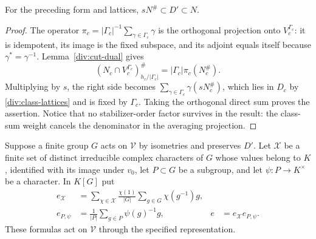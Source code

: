 \begin{proposition}\label{div:class-dual}
For the preceding form and lattices, $sN^\#\subset D'\subset N$.
\end{proposition}
\begin{proof}
The operator $\pi_c=|\Gamma_c|^{-1}\sum_{\gamma\in\Gamma_c}\gamma$
is the orthogonal projection onto $V_c^{\Gamma_c}$: it is idempotent,
its image is the fixed subspace, and its adjoint equals itself because
$\gamma^*=\gamma^{-1}$. Lemma~\ref{div:cut-dual} gives
\[
 (N_c\cap V_c^{\Gamma_c})^\#_{h_c/|\Gamma_c|}
          =|\Gamma_c|\pi_c(N_c^\#).
\]
Multiplying by $s$, the right side becomes
$\sum_{\gamma\in\Gamma_c}\gamma(sN_c^\#)$, which lies in $D_c$
by \eqref{div:class-lattices} and is fixed by $\Gamma_c$.
Taking the orthogonal direct sum proves the assertion. Notice that
no stabilizer-order factor survives in the result: the class-sum
weight cancels the denominator in the averaging projection.
\end{proof}

Suppose a finite group $G$ acts on $\mathcal V$ by isometries and
preserves $D'$. Let $\mathcal X$ be a finite set of distinct irreducible
complex characters of $G$ whose values belong to $K$, identified with
its image under $v_0$, let $P\subset G$ be a
subgroup, and let $\psi:P\to K^\times$ be a character. In $K[G]$ put
\begin{align*}
 e_{\mathcal X}
   &=\sum_{\chi\in\mathcal X}\frac{\chi(1)}{|G|}
                      \sum_{g\in G}\chi(g^{-1})g,\\
 e_{P,\psi}&=\frac1{|P|}\sum_{g\in P}\psi(g)^{-1}g,
       &e&=e_{\mathcal X}e_{P,\psi}.
\end{align*}
These formulas act on $\mathcal V$ through the specified representation.

